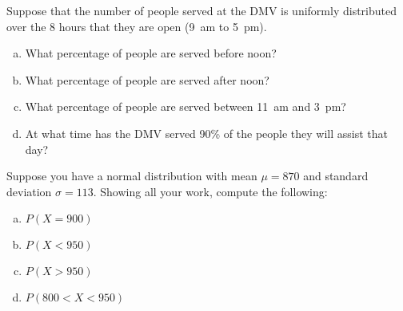 \documentclass[11pt,letterpaper]{article}
\begin{document}

 Suppose that the number of people served at the DMV is uniformly distributed over the 8 hours that they are open (9~am to 5~pm). 
	\begin{enumerate}[(a)]
	\item What percentage of people are served before noon?
	\item What percentage of people are served after noon?
	\item What percentage of people are served between 11~am and 3~pm? 
	\item At what time has the DMV served 90\% of the people they will assist that day?
	\end{enumerate}



\newpage



 Suppose you have a normal distribution with mean $\mu= 870$ and standard deviation $\sigma= 113$. Showing all your work, compute the following:
	\begin{enumerate}[(a)]
	\item $P(X= 900)$
	\item $P(X < 950)$
	\item $P(X > 950)$
	\item $P(800 < X < 950)$
	\end{enumerate}
\end{document}

